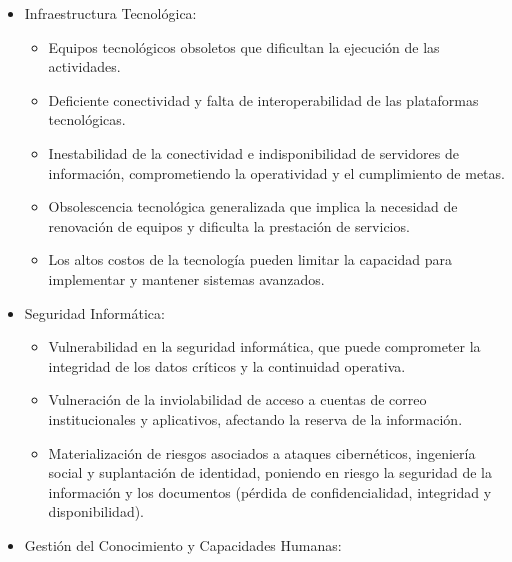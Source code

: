 \documentclass[
	a4paper, %
	12pt, %
]{include/CSSullivanBusinessReport}
\def\tightlist{}
\begin{document}
\begin{itemize}
\tightlist
\item
  Infraestructura Tecnológica:

  \begin{itemize}
  \tightlist
  \item
    Equipos tecnológicos obsoletos que dificultan la ejecución de las
    actividades.
  \item
    Deficiente conectividad y falta de interoperabilidad de las
    plataformas tecnológicas.
  \item
    Inestabilidad de la conectividad e indisponibilidad de servidores de
    información, comprometiendo la operatividad y el cumplimiento de
    metas.
  \item
    Obsolescencia tecnológica generalizada que implica la necesidad de
    renovación de equipos y dificulta la prestación de servicios.
  \item
    Los altos costos de la tecnología pueden limitar la capacidad para
    implementar y mantener sistemas avanzados.
  \end{itemize}
\item
  Seguridad Informática:

  \begin{itemize}
  \tightlist
  \item
    Vulnerabilidad en la seguridad informática, que puede comprometer la
    integridad de los datos críticos y la continuidad operativa.
  \item
    Vulneración de la inviolabilidad de acceso a cuentas de correo
    institucionales y aplicativos, afectando la reserva de la
    información.
  \item
    Materialización de riesgos asociados a ataques cibernéticos,
    ingeniería social y suplantación de identidad, poniendo en riesgo la
    seguridad de la información y los documentos (pérdida de
    confidencialidad, integridad y disponibilidad).
  \end{itemize}
\item
  Gestión del Conocimiento y Capacidades Humanas:


\end{itemize}
\end{document}
